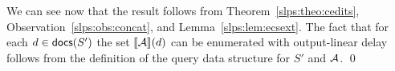 We can see now that the result follows from Theorem~\ref{slps:theo:cedits}, Observation~\ref{slps:obs:concat}, and Lemma~\ref{slps:lem:ecsext}. The fact that for each $d\in \textsf{docs}(S')$ the set ${\llbracket{\mathcal{A}}\rrbracket}(d)$ can be enumerated with output-linear delay follows from the definition of the query data structure for $S'$ and $\mathcal{A}$. \qed
